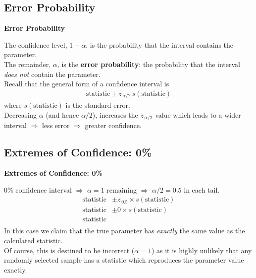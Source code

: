 \documentclass[compress]{beamer}        %
\makeatletter
\newcommand{\tcb}{\textcolor{beamer@blendedblue}}
\makeatother
\begin{document}
\subsection{Error Probability}
\begin{frame}{\bf \tcb{Error Probability}}

The confidence level, $1-\alpha$, is the probability that the interval contains the parameter.\\[0.4cm]

The remainder, $\alpha$, is the {\bf error probability}: the probability that the interval \emph{does not} contain the parameter.\\[1cm]

Recall that the general form of a confidence interval is
\begin{align*}
\text{statistic} \pm z_{\,\alpha/2}\,s(\text{statistic})
\end{align*}
where $s(\text{statistic})$ is the standard error.\\[1cm]



Decreasing $\alpha$ (and hence $\alpha/2$), increases the $z_{\,\alpha/2}$ value which leads to a wider interval $\Rightarrow$ less error $\Rightarrow$ greater confidence.

\end{frame}



\subsection{Extremes of Confidence: 0\%}
\begin{frame}{\bf \tcb{Extremes of Confidence: 0\%}}

0\% confidence interval $\Rightarrow$ $\alpha=1$ remaining $\Rightarrow$ $\alpha/2 = 0.5$ in each tail.\\[-0.2cm]
\begin{align*}
\text{statistic} &\pm z_{\,0.5}\times s(\text{statistic})\\
\text{statistic} &\pm 0\times s(\text{statistic}) \\
\text{statistic}&\\
\end{align*}
In this case we claim that the true parameter has \emph{exactly} the same value as the calculated statistic.\\[0.6cm]

Of course, this is destined to be incorrect ($\alpha=1$) as it is highly unlikely that any randomly selected sample has a statistic which reproduces the parameter value exactly.

\end{frame}
\end{document}

